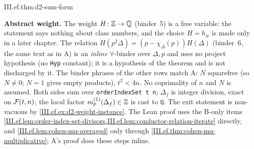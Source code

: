 \begin{theorem}
\end{theorem}
\begin{tfformal}{III.ef.thm:d2-sum-form}
\begin{tffidelity}
\textbf{Abstract weight.} The weight $H\colon\mathbb{Z}\to\mathbb{Q}$ (binder~5) is a free variable: the statement says nothing about class numbers, and the choice $H=h_w$ is made only in a later chapter. The relation $H(p^2\Delta)=(p-\chi_\Delta(p))H(\Delta)$ (binder~6, the same text as in A) is an \emph{inline} $\forall$-binder over $\Delta,p$ and uses no project hypothesis (no \texttt{Hyp} constant); it is a hypothesis of the theorem and is not discharged by it. The binder phrases of the other rows match A: $N$ squarefree (so $N\ne0$; $N=1$ gives empty products), $t^2<4n$. No coprimality of $n$ and $N$ is assumed. Both sides sum over \texttt{orderIndexSet t n}; $\Delta_f$ is integer division, exact on $\mathcal{F}(t,n)$; the local factor $m^{(1)}_p(\Delta_f)\in\mathbb{Z}$ is cast to \texttt{ℚ}. The exit statement is non-vacuous by \cref{III.ef.ex:d2-weight-instance}. The Lean proof uses the B-only items \cref{III.ef.lem:order-index-set-divisors,III.ef.lem:conductor-relation-iterate} directly, and \cref{III.ef.lem:cohen-mu-averaged} only through \cref{III.ef.thm:cohen-mu-multiplicative}; A's proof does these steps inline.
\end{tffidelity}
\end{tfformal}
